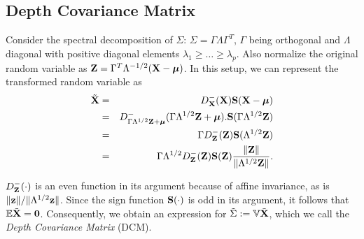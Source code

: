 
\subsection{Depth Covariance Matrix}
\label{subsec:dcm}
Consider the spectral decomposition of $\Sigma$: $\Sigma = \Gamma\Lambda\Gamma^T$, $\Gamma$ being orthogonal and $\Lambda$ diagonal with positive diagonal elements $\lambda_1 \geq \ldots \geq \lambda_p$. Also normalize the original random variable as ${\mathbf{Z}} = \Gamma^T\Lambda^{-1/2} ({\mathbf{X}} - {\boldsymbol{\mu}})$. In this setup, we can represent the transformed random variable as
%
\begin{eqnarray}
\tilde {{\mathbf{X}}} &=& D^-_{{\mathbf{X}}} ({\mathbf{X}}) {\mathbf{S}}({\mathbf{X}} - {\boldsymbol{\mu}}) \notag \\
&=& D^-_{\Gamma\Lambda^{1/2}{\mathbf{Z}} + {\boldsymbol{\mu}}} (\Gamma\Lambda^{1/2} {\mathbf{Z}} + {\boldsymbol{\mu}}). {\mathbf{S}}(\Gamma\Lambda^{1/2} {\mathbf{Z}}) \notag \\
&=& \Gamma D^-_{{\mathbf{Z}}}({\mathbf{Z}}) {\mathbf{S}}(\Lambda^{1/2}{\mathbf{Z}}) \notag \\
&=& \Gamma \Lambda^{1/2} D^-_{{\mathbf{Z}}}({\mathbf{Z}}) {\mathbf{S}}({\mathbf{Z}}) \frac{\| {\mathbf{Z}} \|}{\|\Lambda^{1/2} {\mathbf{Z}} \|}.
\label{equation:rankdecomp}
\end{eqnarray}
%

$D^-_{\mathbf{Z}}(\cdot)$ is an even function in its argument because of affine invariance, as is $\| {\bf{z}} \| / \|\Lambda^{1/2} {\bf{z}} \|$. Since the sign function ${\mathbf{S}}(\cdot)$ is odd in its argument, it follows that ${\mathbb{E}} \tilde {{\mathbf{X}}} = \bf0$. Consequently, we obtain an expression for $\tilde \Sigma := {\mathbb{V}} \tilde {{\mathbf{X}}}$, which we call the {\it Depth Covariance Matrix} (DCM).

